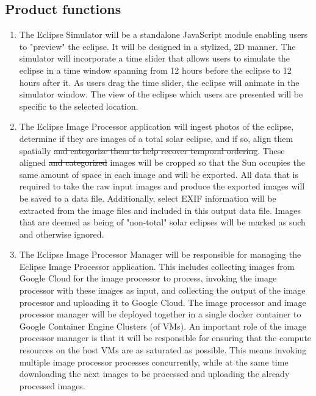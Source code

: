 \documentclass[10pt, onecolumn, draftclsnofoot, letterpaper, compsoc]{IEEEtran}
\begin{document}
\subsection{Product functions}
	\begin{enumerate}
		\item The Eclipse Simulator will be a standalone JavaScript 
		module enabling users to "preview" the eclipse. It will be 
		designed in a stylized, 2D manner. The simulator will 
		incorporate a time slider that allows users to simulate the 
		eclipse in a time window spanning from 12 hours before the 
		eclipse to 12 hours after it. As users drag the time 
		slider, the eclipse will animate in the simulator window. 
		The view of the eclipse which users are presented will be 
		specific to the selected location.

		\item The Eclipse Image Processor application will ingest 
		photos of the eclipse, determine if they are images of a 
		total solar eclipse, and if so, align them spatially
		\sout{and categorize them to help recover temporal ordering}. 
		These aligned \sout{and categorized}
		images will be cropped so that the Sun 
		occupies the same amount of space in each image and will be 
		exported. All data that is required to take the raw input 
		images and produce the exported images will be saved to a 
		data file. Additionally, select EXIF information will be 
		extracted from the image files and included in this output
		data file. Images that are deemed as being of "non-total" solar
		eclipses will be marked as such and otherwise ignored.

		\item The Eclipse Image Processor Manager will be responsible for 
		managing the Eclipse Image Processor application. This includes 
		collecting images from Google Cloud for the image processor to process,
		invoking the image processor with these images as input, and collecting 
		the output of the image processor and uploading it to Google Cloud. The 
		image processor and image processor manager will be deployed together 
		in a single docker container to Google Container Engine Clusters (of VMs).
		An important role of the image processor manager is that it will be responsible 
		for ensuring that the compute resources on the host VMs are as saturated as 
		possible. This means invoking multiple image processor processes concurrently, 
		while at the same time downloading the next images to be processed and uploading 
		the already processed images.
		
		
	\end{enumerate}
\end{document}
